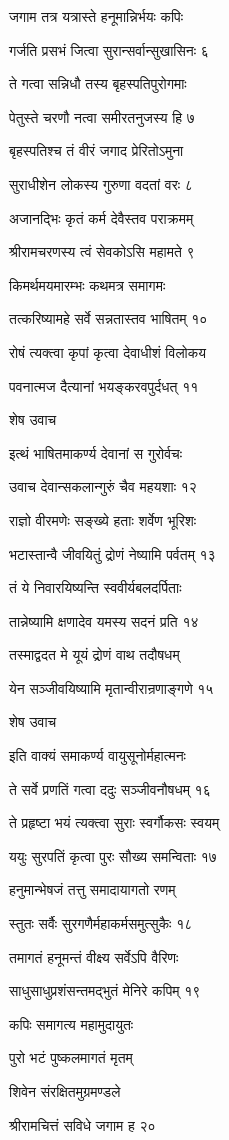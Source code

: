 जगाम तत्र यत्रास्ते हनूमान्निर्भयः कपिः

गर्जति प्रसभं जित्वा सुरान्सर्वान्सुखासिनः ६

ते गत्वा सन्निधौ तस्य बृहस्पतिपुरोगमाः

पेतुस्ते चरणौ नत्वा समीरतनुजस्य हि ७

बृहस्पतिश्च तं वीरं जगाद प्रेरितोऽमुना

सुराधीशेन लोकस्य गुरुणा वदतां वरः ८

अजानद्भिः कृतं कर्म देवैस्तव पराक्रमम्

श्रीरामचरणस्य त्वं सेवकोऽसि महामते ९

किमर्थमयमारम्भः कथमत्र समागमः

तत्करिष्यामहे सर्वे सन्नतास्तव भाषितम् १०

रोषं त्यक्त्वा कृपां कृत्वा देवाधीशं विलोकय

पवनात्मज दैत्यानां भयङ्करवपुर्दधत् ११

शेष उवाच

इत्थं भाषितमाकर्ण्य देवानां स गुरोर्वचः

उवाच देवान्सकलान्गुरुं चैव महयशाः १२

राज्ञो वीरमणेः सङ्ख्ये हताः शर्वेण भूरिशः

भटास्तान्वै जीवयितुं द्रोणं नेष्यामि पर्वतम् १३

तं ये निवारयिष्यन्ति स्ववीर्यबलदर्पिताः

तान्नेष्यामि क्षणादेव यमस्य सदनं प्रति १४

तस्माद्वदत मे यूयं द्रोणं वाथ तदौषधम्

येन सञ्जीवयिष्यामि मृतान्वीरान्रणाङ्गणे १५

शेष उवाच

इति वाक्यं समाकर्ण्य वायुसूनोर्महात्मनः

ते सर्वे प्रणतिं गत्वा ददुः सञ्जीवनौषधम् १६

ते प्रहृष्टा भयं त्यक्त्वा सुराः स्वर्गौकसः स्वयम्

ययुः सुरपतिं कृत्वा पुरः सौख्य समन्विताः १७

हनुमान्भेषजं तत्तु समादायागतो रणम्

स्तुतः सर्वैः सुरगणैर्महाकर्मसमुत्सुकैः १८

तमागतं हनूमन्तं वीक्ष्य सर्वेऽपि वैरिणः

साधुसाधुप्रशंसन्तमद्भुतं मेनिरे कपिम् १९

कपिः समागत्य महामुदायुतः

पुरो भटं पुष्कलमागतं मृतम्

शिवेन संरक्षितमुग्रमण्डले

श्रीरामचित्तं सविधे जगाम ह २०

